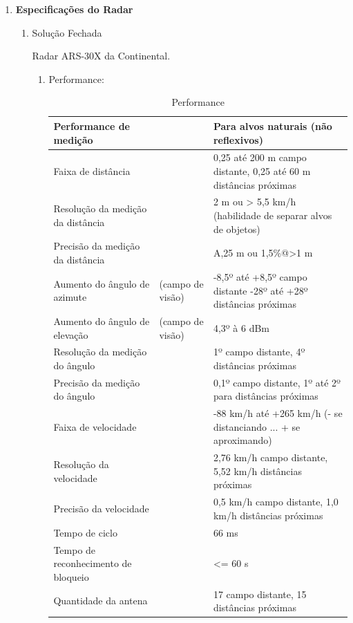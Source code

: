 \begin{enumerate}
\item \textbf{Especificações do Radar}

\begin{enumerate}
  \item Solução Fechada

  Radar ARS-30X da Continental.
  \begin{enumerate}
    \item Performance:
      \begin{table}[]
      \centering
      \label{habitacao}
      \begin{tabular}{|l|l|p{5cm}|}
      \hline
      Performance de medição &  & Para alvos naturais (não reflexivos)\\ \hline
      Faixa de distância       &  & 0,25 até 200 m campo distante, 0,25 até 60 m distâncias próximas \\ \hline
      Resolução da medição da distância & & 2 m ou > 5,5 km/h (habilidade de separar alvos de objetos)\\ \hline
      Precisão da medição da distância & & A,25 m ou 1,5\%@>1 m\\ \hline
      Aumento do ângulo de azimute & (campo de visão) & -8,5º até +8,5º campo distante -28º até +28º distâncias próximas\\ \hline
      Aumento do ângulo de elevação & (campo de visão) & 4,3º à 6 dBm\\ \hline
      Resolução da medição do ângulo & & 1º campo distante, 4º distâncias próximas\\ \hline
      Precisão da medição do ângulo & & 0,1º campo distante, 1º até 2º para distâncias próximas\\ \hline
      Faixa de velocidade & & -88 km/h até +265 km/h (- se distanciando ... + se aproximando)\\ \hline
      Resolução da velocidade & & 2,76 km/h campo distante, 5,52 km/h distâncias próximas\\ \hline
      Precisão da velocidade & & 0,5 km/h campo distante, 1,0 km/h distâncias próximas\\ \hline
      Tempo de ciclo & & 66 ms\\ \hline
      Tempo de reconhecimento de bloqueio & & <= 60 s\\ \hline
      Quantidade da antena & & 17 campo distante, 15 distâncias próximas\\
      \hline
      \end{tabular}
      \caption{Performance}
      \end{table}


\end{enumerate}
\end{enumerate}
\end{enumerate}
